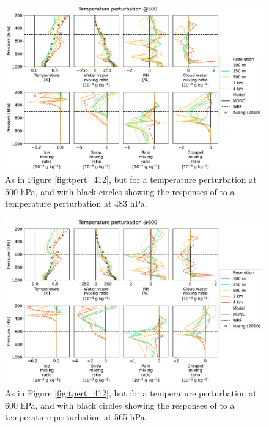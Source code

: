 \documentclass[draft]{agujournal2019}
\begin{document}
\begin{figure}[pth]
    \noindent\includegraphics[width=\textwidth]{figures/pert_diffs_T_0.5_@500}
    \caption{As in Figure \ref{fig:tpert_412}, but for a temperature
    perturbation at 500 hPa, and with black circles showing the responses of
     to a temperature perturbation at 483 hPa.}
    \label{fig:tpert_500}
\end{figure}

\begin{figure}[pth]
    \noindent\includegraphics[width=\textwidth]{figures/pert_diffs_T_0.5_@600}
    \caption{As in Figure \ref{fig:tpert_412}, but for a temperature
    perturbation at 600 hPa, and with black circles showing the responses of
     to a temperature perturbation at 565 hPa.}
    \label{fig:tpert_600}
\end{figure}
\end{document}
